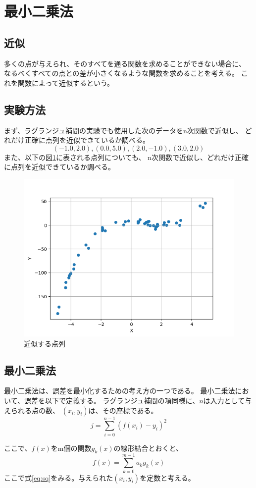 \documentclass{jsarticle}
\begin{document}
\section{最小二乗法}
\subsection{近似}
多くの点が与えられ、そのすべてを通る関数を求めることができない場合に、
なるべくすべての点との差が小さくなるような関数を求めることを考える。
これを関数によって近似するという。

\subsection{実験方法}
まず、ラグランジュ補間の実験でも使用した次のデータをn次関数で近似し、
どれだけ正確に点列を近似できているか調べる。
\[
    (-1.0,2.0),
    (0.0,5.0),
    (2.0,-1.0),
    (3.0,2.0)
\] 
また、以下の図\ref{fig:sq_ingraph}に表される点列についても、
n次関数で近似し、どれだけ正確に点列を近似できているか調べる。
\begin{figure}[htbp]
    \begin{center}
        \includegraphics[width=0.5\hsize]{sq_in.png}
        \caption{近似する点列}\label{fig:sq_ingraph}            
    \end{center}
\end{figure}

\subsection{最小二乗法}
最小二乗法は、誤差を最小化するための考え方の一つである。
最小二乗法において、誤差を以下で定義する。
ラグランジュ補間の項同様に、\(n\)は入力として与えられる点の数、
\((x_i,y_i)\)は、その座標である。
\begin{equation}
    j=\sum^{n-1}_{i=0} ( f(x_i)-y_{i} )^2
    \label{eq:sq}
\end{equation}

ここで、\(f(x)\)をm個の関数\(g_k(x)\)の線形結合とおくと、
\begin{equation}
    f(x)=\sum^{m-1}_{k=0}a_{k}g_k(x)
\end{equation}
ここで式\ref{eq:sq}をみる。与えられた\((x_i,y_i)\)を定数と考える。
\end{document}
